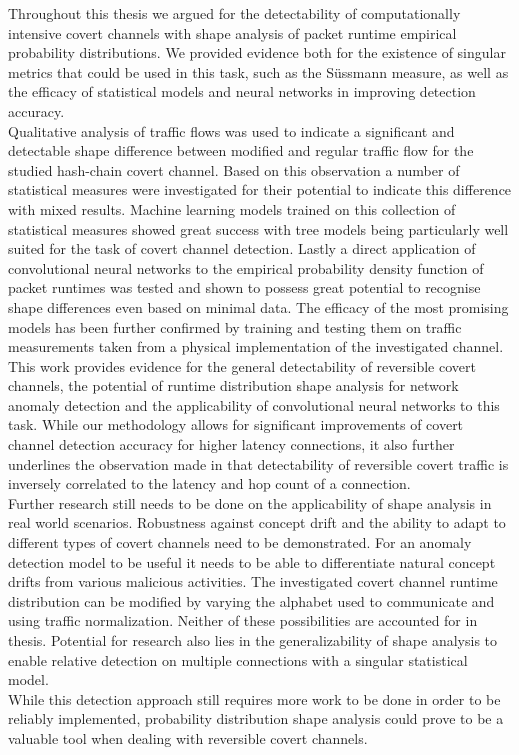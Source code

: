 \documentclass[12pt,a4paper,automark, toc=bib]{scrreprt}
\theoremstyle{definition}
\begin{document}
			Throughout this thesis we argued for the detectability of computationally intensive covert channels with shape analysis of packet runtime empirical probability distributions. We provided evidence both for the existence of singular metrics that could be used in this task, such as the Süssmann measure, as well as the efficacy of statistical models and neural networks in improving detection accuracy. \\
			Qualitative analysis of traffic flows was used to indicate a significant and detectable shape difference between modified and regular traffic flow for the studied hash-chain covert channel. Based on this observation a number of statistical measures were investigated for their potential to indicate this difference with mixed results. Machine learning models trained on this collection of statistical measures showed great success with tree models being particularly well suited for the task of covert channel detection. Lastly a direct application of convolutional neural networks to the empirical probability density function of packet runtimes was tested and shown to possess great potential to recognise shape differences even based on minimal data. The efficacy of the most promising models has been further confirmed by training and testing them on traffic measurements taken from a physical implementation of the investigated channel. \\
			This work provides evidence for the general detectability of reversible covert channels, the potential of runtime distribution shape analysis for network anomaly detection and the applicability of convolutional neural networks to this task. While our methodology allows for significant improvements of covert channel detection accuracy for higher latency connections, it also further underlines the observation made in  \cite{Schmidbauer} that detectability of reversible covert traffic is inversely correlated to the latency and hop count of a connection.\\
			Further research still needs to be done on the applicability of shape analysis in real world scenarios. Robustness against concept drift and the ability to adapt to different types of covert channels need to be demonstrated. For an anomaly detection model to be useful it needs to be able to differentiate natural concept drifts from various malicious activities. The investigated covert channel runtime distribution can be modified by varying the alphabet used to communicate and using traffic normalization. Neither of these possibilities are accounted for in thesis. Potential for research also lies in the generalizability of shape analysis to enable relative detection on multiple connections with a singular statistical model. \\ 
			While this detection approach still requires more work to be done in order to be reliably implemented, probability distribution shape analysis could prove to be a valuable tool when dealing with reversible covert channels.
			
	
	\pagebreak
	
	\printbibliography
	
\end{document}
